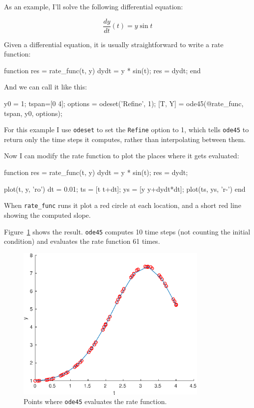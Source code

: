\documentclass[
]{book}
\numberwithin{Answer}{chapter}
\numberwithin{Exercise}{chapter}
\begin{document}

As an example, I'll solve the following differential equation:

\[ \frac{dy}{dt}(t) = y \sin t \] 

Given a differential equation, it is usually straightforward to write a rate function:

\begin{code}
function res = rate_func(t, y)
    dydt = y * sin(t);
    res = dydt;
end
\end{code}

And we can call it like this:

\begin{code}
    y0 = 1;
    tspan=[0 4];
    options = odeset('Refine', 1);
    [T, Y] = ode45(@rate_func, tspan, y0, options);
\end{code}

For this example I use {\tt odeset} to set the {\tt Refine} option to 1, which tells {\tt ode45} to return only the time steps it computes, rather than interpolating between them.


Now I can modify the rate function to plot the places where it gets evaluated:

\begin{code}
function res = rate_func(t, y)
    dydt = y * sin(t);
    res = dydt;

    plot(t, y, 'ro')
    dt = 0.01;
    ts = [t t+dt];
    ys = [y y+dydt*dt];
    plot(ts, ys, 'r-')
end
\end{code}

When \verb"rate_func" runs it plot a red circle at each location, and a short red line showing the computed slope.


Figure~\ref{fig:odeplot1} shows the result.  {\tt ode45} computes 10 time steps (not counting the initial condition) and evaluates the rate function 61 times.

\begin{figure}
\centerline{\includegraphics[height=3in]{book/figs/odeplot1.eps}}
\caption{Points where {\tt ode45} evaluates the rate function.}
\label{fig:odeplot1}
\end{figure}
\end{document}
